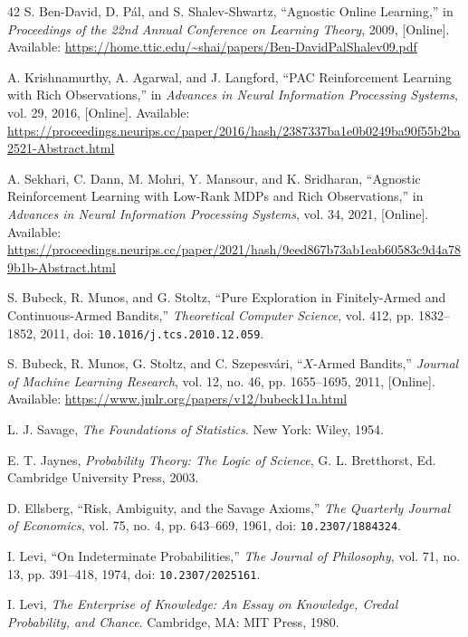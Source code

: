 \begin{thebibliography}{42}
S. Ben-David, D. P\'{a}l, and S. Shalev-Shwartz, ``Agnostic Online Learning,'' in \emph{Proceedings of the 22nd Annual Conference on Learning Theory}, 2009, [Online]. Available: \url{https://home.ttic.edu/~shai/papers/Ben-DavidPalShalev09.pdf}

A. Krishnamurthy, A. Agarwal, and J. Langford, ``PAC Reinforcement Learning with Rich Observations,'' in \emph{Advances in Neural Information Processing Systems}, vol. 29, 2016, [Online]. Available: \url{https://proceedings.neurips.cc/paper/2016/hash/2387337ba1e0b0249ba90f55b2ba2521-Abstract.html}

A. Sekhari, C. Dann, M. Mohri, Y. Mansour, and K. Sridharan, ``Agnostic Reinforcement Learning with Low-Rank MDPs and Rich Observations,'' in \emph{Advances in Neural Information Processing Systems}, vol. 34, 2021, [Online]. Available: \url{https://proceedings.neurips.cc/paper/2021/hash/9eed867b73ab1eab60583c9d4a789b1b-Abstract.html}

S. Bubeck, R. Munos, and G. Stoltz, ``Pure Exploration in Finitely-Armed and Continuous-Armed Bandits,'' \emph{Theoretical Computer Science}, vol. 412, pp. 1832--1852, 2011, doi: \nolinkurl{10.1016/j.tcs.2010.12.059}.

S. Bubeck, R. Munos, G. Stoltz, and C. Szepesv\'{a}ri, ``$X$-Armed Bandits,'' \emph{Journal of Machine Learning Research}, vol. 12, no. 46, pp. 1655--1695, 2011, [Online]. Available: \url{https://www.jmlr.org/papers/v12/bubeck11a.html}

L. J. Savage, \emph{The Foundations of Statistics}. New York: Wiley, 1954.

E. T. Jaynes, \emph{Probability Theory: The Logic of Science}, G. L. Bretthorst, Ed. Cambridge University Press, 2003.

D. Ellsberg, ``Risk, Ambiguity, and the Savage Axioms,'' \emph{The Quarterly Journal of Economics}, vol. 75, no. 4, pp. 643--669, 1961, doi: \nolinkurl{10.2307/1884324}.

I. Levi, ``On Indeterminate Probabilities,'' \emph{The Journal of Philosophy}, vol. 71, no. 13, pp. 391--418, 1974, doi: \nolinkurl{10.2307/2025161}.

I. Levi, \emph{The Enterprise of Knowledge: An Essay on Knowledge, Credal Probability, and Chance}. Cambridge, MA: MIT Press, 1980.


\end{thebibliography}
